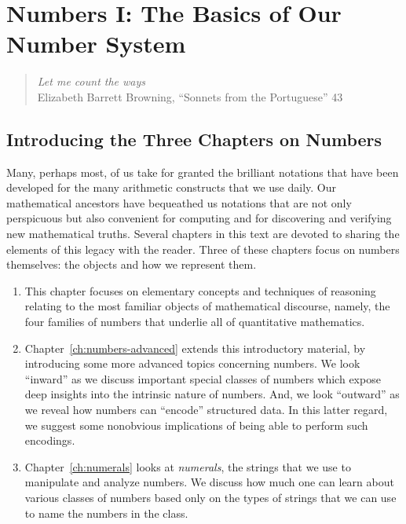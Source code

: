 
\chapter{Numbers I:
The Basics of Our Number System}
\label{ch:numbers-numerals}

\begin{quote}
{\em Let me count the ways} \\
\hspace*{1in}Elizabeth Barrett Browning, ``Sonnets from
the Portuguese'' 43
\end{quote}

\section{Introducing the Three Chapters on Numbers}

Many, perhaps most, of us take for granted the brilliant notations
that have been developed for the many arithmetic constructs that we
use daily.  Our mathematical ancestors have bequeathed us notations
that are not only perspicuous but also convenient for computing and
for discovering and verifying new mathematical truths.  Several
chapters in this text are devoted to sharing the elements of this
legacy with the reader.  Three of these chapters focus on numbers
themselves: the objects and how we represent them.
\begin{enumerate}
\item
This chapter focuses on elementary concepts and techniques of
reasoning relating to the most familiar objects of mathematical
discourse, namely, the four families of numbers that underlie all of
quantitative mathematics.
\item
Chapter~\ref{ch:numbers-advanced} extends this introductory material,
by introducing some more advanced topics concerning numbers.  We look
``inward'' as we discuss important special classes of numbers which
expose deep insights into the intrinsic nature of numbers.  And, we
look ``outward'' as we reveal how numbers can ``encode'' structured
data.  In this latter regard, we suggest some nonobvious implications
of being able to perform such encodings.
\item
Chapter~\ref{ch:numerals} looks at {\it numerals}, 
the strings that we use to manipulate and analyze numbers.
 We discuss how much one can learn
about various classes of numbers based only on the types of strings
that we can use to name the numbers in the class.
\end{enumerate}

